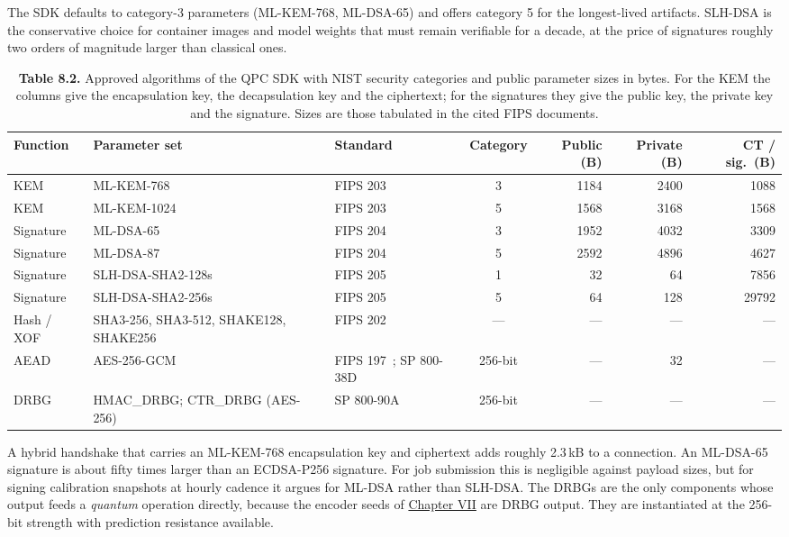 \documentclass{report}
\theoremstyle{plain}
\theoremstyle{definition}
\theoremstyle{remark}
\begin{document}
The SDK defaults to category-3 parameters (ML-KEM-768, ML-DSA-65) and offers category 5 for the longest-lived artifacts. SLH-DSA is the conservative choice for container images and model weights that must remain verifiable for a decade, at the price of signatures roughly two orders of magnitude larger than classical ones.

\begin{table}[htbp]
\caption{\textbf{Table 8.2.} Approved algorithms of the QPC SDK with NIST security categories and public parameter sizes in bytes. For the KEM the columns give the encapsulation key, the decapsulation key and the ciphertext; for the signatures they give the public key, the private key and the signature. Sizes are those tabulated in the cited FIPS documents.}
\label{tab:pqc:algorithms}
 
  \footnotesize


\begin{tabular}{lllcrrr}
\toprule
Function & Parameter set & Standard & Category & Public (B) & Private (B) & CT / sig.\ (B) \\
\midrule
KEM & ML-KEM-768 & FIPS 203~\cite{nist2024fips203} & 3 & 1184 & 2400 & 1088 \\
KEM & ML-KEM-1024 & FIPS 203~\cite{nist2024fips203} & 5 & 1568 & 3168 & 1568 \\
Signature & ML-DSA-65 & FIPS 204~\cite{nist2024fips204} & 3 & 1952 & 4032 & 3309 \\
Signature & ML-DSA-87 & FIPS 204~\cite{nist2024fips204} & 5 & 2592 & 4896 & 4627 \\
Signature & SLH-DSA-SHA2-128s & FIPS 205~\cite{nist2024fips205} & 1 & 32 & 64 & 7856 \\
Signature & SLH-DSA-SHA2-256s & FIPS 205~\cite{nist2024fips205} & 5 & 64 & 128 & 29792 \\
Hash / XOF & SHA3-256, SHA3-512, SHAKE128, SHAKE256 & FIPS 202~\cite{nist2015fips202} & --- & --- & --- & --- \\
AEAD & AES-256-GCM & FIPS 197~\cite{nist2001fips197}; SP 800-38D~\cite{nist2007sp80038d} & 256-bit & --- & 32 & --- \\
DRBG & HMAC\_DRBG; CTR\_DRBG (AES-256) & SP 800-90A~\cite{nist2015sp80090a} & 256-bit & --- & --- & --- \\
\bottomrule
\end{tabular}
 
\end{table}

A hybrid handshake that carries an ML-KEM-768 encapsulation key and ciphertext adds roughly 2.3 kB to a connection. An ML-DSA-65 signature is about fifty times larger than an ECDSA-P256 signature. For job submission this is negligible against payload sizes, but for signing calibration snapshots at hourly cadence it argues for ML-DSA rather than SLH-DSA. The DRBGs are the only components whose output feeds a \emph{quantum} operation directly, because the encoder seeds of \hyperref[ch:qec]{Chapter VII} are DRBG output. They are instantiated at the 256-bit strength with prediction resistance available.
\end{document}
